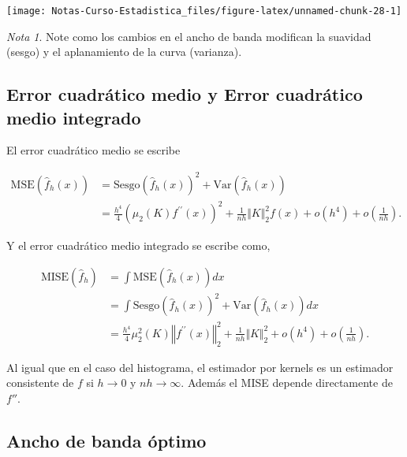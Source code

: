 \documentclass[
  12pt,
]{book}
\theoremstyle{definition}
\theoremstyle{definition}
\theoremstyle{definition}
\theoremstyle{definition}
\theoremstyle{remark}
\newtheorem*{remark}{Nota}
\begin{document}
\begin{center}\texttt{[image: Notas-Curso-Estadistica\_files/figure-latex/unnamed-chunk-28-1]} \end{center}

\begin{remark}
Note como los cambios en el ancho de banda modifican la suavidad (sesgo) y el aplanamiento de la curva (varianza).
\end{remark}

\hypertarget{error-cuadruxe1tico-medio-y-error-cuadruxe1tico-medio-integrado}{%
\subsection{Error cuadrático medio y Error cuadrático medio integrado}\label{error-cuadruxe1tico-medio-y-error-cuadruxe1tico-medio-integrado}}

El error cuadrático medio se escribe

\begin{align*}
\mathrm{MSE}(\hat{f}_{h}(x))
& = \mathrm{Sesgo}\left(\hat{f}_{h}(x)\right)^{2} + \mathrm{Var}\left(\hat{f}_{h}(x)\right)                                                 \\
& = \frac{h^{4}}{4}\left(\mu_{2}(K)f^{\prime\prime}(x)\right)^{2}+\frac{1}{nh}\Vert K\Vert_{2}^{2}f(x)+o(h^{4})+o\left(\frac{1}{nh}\right).
\end{align*}

Y el error cuadrático medio integrado se escribe como,

\begin{align*}
\mathrm{MISE}\left(\hat{f}_{h}\right) & = \int \mathrm{MSE}\left(\hat{f}_{h}(x)\right)dx                                                                                                        \\
& = \int \mathrm{Sesgo}\left(\hat{f}_{h}(x)\right)^{2} + \mathrm{Var}\left(\hat{f}_{h}(x)\right)dx                                                        \\
& = \frac{h^{4}}{4}\mu_{2}^{2}(K)\left\Vert f^{\prime\prime}(x)\right\Vert_{2}^{2} +\frac{1}{nh}\Vert K\Vert_{2}^{2}+o(h^{4})+o\left(\frac{1}{nh}\right).
\end{align*}

Al igual que en el caso del histograma, el estimador por kernels es un estimador consistente de \(f\) si \(h\rightarrow 0\) y \(nh\rightarrow \infty\). Además el MISE depende directamente de \(f''\).

\hypertarget{ancho-de-banda-uxf3ptimo}{%
\subsection{Ancho de banda óptimo}\label{ancho-de-banda-uxf3ptimo}}
\end{document}
